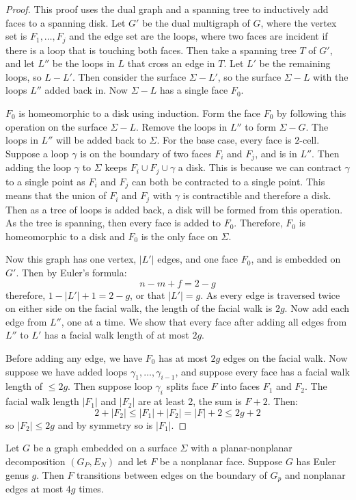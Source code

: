 \begin{proof}
	This proof uses the dual graph and a spanning tree to inductively add faces to a spanning disk. 
	Let \(G'\) be the dual multigraph of $G$, where the vertex set is \(F_1, \ldots, F_j\) and the edge set are the loops, where two faces are incident if there is a loop that is touching both faces. Then take a spanning tree \(T\) of \(G'\), and let \(L''\) be the loops in $L$ that cross an edge in \(T\). Let $L'$ be the remaining loops, so $L - L'$. 
	Then consider the surface \(\Sigma - L'\), so the surface $\Sigma - L$ with the loops $L''$ added back in. Now $\Sigma - L$ has a single face $F_0$.

	$F_0$ is homeomorphic to a disk using induction. Form the face $F_0$ by following this operation on the surface $\Sigma - L$. Remove the loops in $L''$ to form $\Sigma - G$. The loops in $L''$ will be added back to $\Sigma$. For the base case, every face is $2$-cell. Suppose a loop $\gamma$ is on the boundary of two faces $F_i$ and $F_j$, and is in $L''$. Then adding the loop $\gamma$ to $\Sigma$ keeps $F_i \cup F_j \cup \gamma$ a disk. This is because we can contract $\gamma$ to a single point as $F_i$ and $F_j$ can both be contracted to a single point. This means that the union of $F_i$ and $F_j$ with $\gamma$ is contractible and therefore a disk. Then as a tree of loops is added back, a disk will be formed from this operation. As the tree is spanning, then every face is added to $F_0$. Therefore, $F_0$ is homeomorphic to a disk and $F_0$ is the only face on $\Sigma$. 

	Now this graph has one vertex, \(|L'|\) edges, and one face \(F_0\), and is embedded on $G'$. Then by Euler's formula:
	\begin{equation}
		n - m + f = 2 - g
	\end{equation}
	therefore, \(1 - |L'| + 1 = 2 - g\), or that \(|L'| = g\). As every edge is traversed twice on either side on the facial walk, the length of the facial walk is \(2g\).
	Now add each edge from \(L''\), one at a time. We show that every face after adding all edges from \(L''\) to \(L'\) has a facial walk length of at most \(2g\).

	Before adding any edge, we have \(F_0\) has at most \(2g\) edges on the facial walk. Now suppose we have added loops \(\gamma_1, \ldots, \gamma_{i - 1}\), and suppose every face has a facial walk length of \(\leq 2g\).
	Then suppose loop \(\gamma_i\) splits face \(F\) into faces \(F_1\) and \(F_2\). The facial walk length \(|F_1|\) and \(|F_2|\) are at least 2, the sum is \(F + 2\). Then:
	\begin{equation}
		2 + |F_2| \leq |F_1| + |F_2| = |F| + 2 \leq 2g + 2
	\end{equation}
	so \(|F_2| \leq 2g\) and by symmetry so is \(|F_1|\).
\end{proof}
\begin{corollary}\label{corr:orientable_nonplanar_faces}
	Let \(G\) be a graph embedded on a surface \(\Sigma\) with a planar-nonplanar decomposition $(G_P, E_N)$ and let \(F\) be a nonplanar face. Suppose \(G\) has Euler genus \(g\). Then \(F\) transitions between edges on the boundary of $G_p$ and nonplanar edges at most $4g$ times.
\end{corollary}

